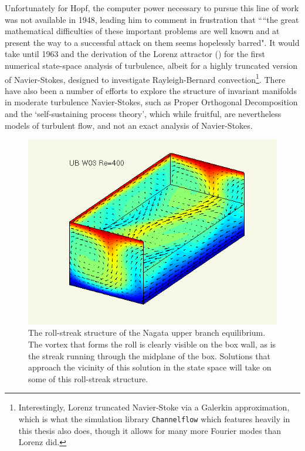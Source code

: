 Unfortunately for Hopf, the computer power necessary to pursue this line of work was not available in 1948, leading him to comment in frustration that ``“the great mathematical difficulties of these important problems are well
known and at present the way to a successful attack on them seems hopelessly
barred". It would take until 1963 and the derivation of the Lorenz attractor () for the first numerical state-space analysis of turbulence, albeit for a highly truncated version of Navier-Stokes, designed to investigate Rayleigh-Bernard convection\footnote{Interestingly, Lorenz truncated Navier-Stoke via a Galerkin approximation, which is what the simulation library {\tt Channelflow} which features heavily in this thesis also does, though it allows for many more Fourier modes than Lorenz did.}. There have also been a number of efforts to explore the structure of invariant manifolds in moderate turbulence Navier-Stokes, such as Proper Orthogonal Decomposition and the `self-sustaining process theory', which while fruitful, are nevertheless models of turbulent flow, and not an exact analysis of Navier-Stokes.\\
\begin{figure}[h]
\centerline{\includegraphics[scale=0.5]{Figs/rollStreak}}
\caption{The roll-streak structure of the Nagata upper branch equilibrium. The vortex that forms the roll is clearly visible on the box wall, as is the streak running through the midplane of the box. Solutions that approach the vicinity of this solution in the state space will take on some of this roll-streak structure.}\label{fig:rollstreak}
\end{figure}
